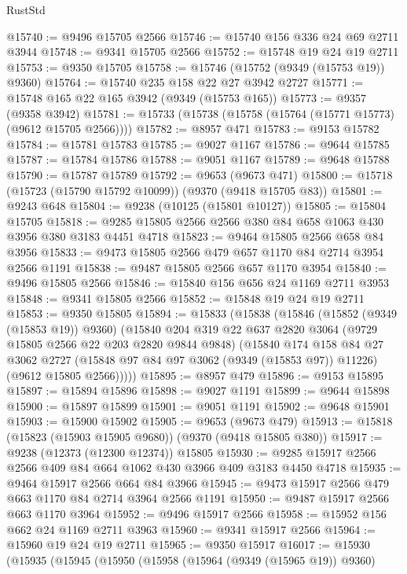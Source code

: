 \begin{lexlean}{RustStd}
\begin{coremodule}
{\begin{coremodule}
{{{{{{{{{{{{{{{{{{{{{{{{{{{{{{{{{{{{{{{@15740 := @9496 @15705 @2566
@15746 := @15740 @156 @336 @24 @69 @2711 @3944
@15748 := @9341 @15705 @2566
@15752 := @15748 @19 @24 @19 @2711
@15753 := @9350 @15705
@15758 := @15746 (@15752 (@9349 (@15753 @19)) @9360)
@15764 := @15740 @235 @158 @22 @27 @3942 @2727
@15771 := @15748 @165 @22 @165 @3942 (@9349 (@15753 @165))
@15773 := @9357 (@9358 @3942)
@15781 := @15733 (@15738 (@15758 (@15764 (@15771 @15773) (@9612 @15705 @2566))))
@15782 := @8957 @471
@15783 := @9153 @15782
@15784 := @15781 @15783
@15785 := @9027 @1167
@15786 := @9644 @15785
@15787 := @15784 @15786
@15788 := @9051 @1167
@15789 := @9648 @15788
@15790 := @15787 @15789
@15792 := @9653 (@9673 @471)
@15800 := @15718 (@15723 (@15790 @15792 @10099)) (@9370 (@9418 @15705 @83))
@15801 := @9243 @648
@15804 := @9238 (@10125 (@15801 @10127))
@15805 := @15804 @15705
@15818 := @9285 @15805 @2566 @2566 @380 @84 @658 @1063 @430 @3956 @380 @3183 @4451 @4718
@15823 := @9464 @15805 @2566 @658 @84 @3956
@15833 := @9473 @15805 @2566 @479 @657 @1170 @84 @2714 @3954 @2566 @1191
@15838 := @9487 @15805 @2566 @657 @1170 @3954
@15840 := @9496 @15805 @2566
@15846 := @15840 @156 @656 @24 @1169 @2711 @3953
@15848 := @9341 @15805 @2566
@15852 := @15848 @19 @24 @19 @2711
@15853 := @9350 @15805
@15894 := @15833
    (@15838
      (@15846
        (@15852 (@9349 (@15853 @19)) @9360)
        (@15840
          @204
          @319
          @22
          @637
          @2820
          @3064
          (@9729 @15805 @2566 @22 @203 @2820 @9844 @9848)
          (@15840
            @174
            @158
            @84
            @27
            @3062
            @2727
            (@15848 @97 @84 @97 @3062 (@9349 (@15853 @97)) @11226)
            (@9612 @15805 @2566)))))
@15895 := @8957 @479
@15896 := @9153 @15895
@15897 := @15894 @15896
@15898 := @9027 @1191
@15899 := @9644 @15898
@15900 := @15897 @15899
@15901 := @9051 @1191
@15902 := @9648 @15901
@15903 := @15900 @15902
@15905 := @9653 (@9673 @479)
@15913 := @15818 (@15823 (@15903 @15905 @9680)) (@9370 (@9418 @15805 @380))
@15917 := @9238 (@12373 (@12300 @12374)) @15805
@15930 := @9285 @15917 @2566 @2566 @409 @84 @664 @1062 @430 @3966 @409 @3183 @4450 @4718
@15935 := @9464 @15917 @2566 @664 @84 @3966
@15945 := @9473 @15917 @2566 @479 @663 @1170 @84 @2714 @3964 @2566 @1191
@15950 := @9487 @15917 @2566 @663 @1170 @3964
@15952 := @9496 @15917 @2566
@15958 := @15952 @156 @662 @24 @1169 @2711 @3963
@15960 := @9341 @15917 @2566
@15964 := @15960 @19 @24 @19 @2711
@15965 := @9350 @15917
@16017 := @15930
    (@15935
      (@15945
        (@15950
          (@15958
            (@15964 (@9349 (@15965 @19)) @9360)
}}}}}}}}}}}}}}}}}}}}}}}}}}}}}}}}}}}}}}}
\end{coremodule}}
\end{coremodule}
\end{lexlean}
